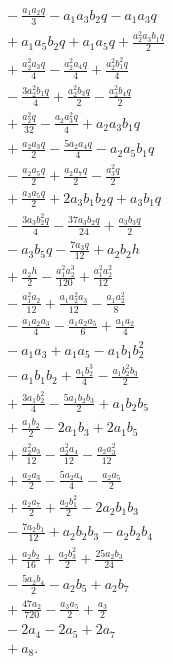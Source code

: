 \begin{align*}
&{}- \frac{a_{1} a_{2} q}{3} - a_{1} a_{3} b_{2} q - a_{1} a_{3} q\\
&{}+ a_{1} a_{5} b_{2} q + a_{1} a_{5} q + \frac{a_{2}^{2} a_{3} b_{1} q}{2}\\
&{}+ \frac{a_{2}^{2} a_{3} q}{4} - \frac{a_{2}^{2} a_{4} q}{4} + \frac{a_{2}^{2} b_{1}^{2} q}{4}\\
&{}- \frac{3 a_{2}^{2} b_{1} q}{4} + \frac{a_{2}^{2} b_{3} q}{2} - \frac{a_{2}^{2} b_{4} q}{2}\\
&{}+ \frac{a_{2}^{2} q}{32} - \frac{a_{2} a_{3}^{2} q}{4} + a_{2} a_{3} b_{1} q\\
&{}+ \frac{a_{2} a_{3} q}{2} - \frac{5 a_{2} a_{4} q}{4} - a_{2} a_{5} b_{1} q\\
&{}- \frac{a_{2} a_{5} q}{2} + \frac{a_{2} a_{7} q}{2} - \frac{a_{3}^{2} q}{2}\\
&{}+ \frac{a_{3} a_{5} q}{2} + 2 a_{3} b_{1} b_{2} q + a_{3} b_{1} q\\
&{}- \frac{3 a_{3} b_{2}^{2} q}{4} - \frac{37 a_{3} b_{2} q}{24} + \frac{a_{3} b_{3} q}{2}\\
&{}- a_{3} b_{5} q - \frac{7 a_{3} q}{12} + a_{2} b_{2} h\\
&{}+ \frac{a_{2} h}{2} - \frac{a_{1}^{2} a_{2}^{3}}{120} + \frac{a_{1}^{2} a_{2}^{2}}{12}\\
&{}- \frac{a_{1}^{2} a_{2}}{12} + \frac{a_{1} a_{2}^{2} a_{3}}{12} - \frac{a_{1} a_{2}^{2}}{8}\\
&{}- \frac{a_{1} a_{2} a_{3}}{4} - \frac{a_{1} a_{2} a_{5}}{6} + \frac{a_{1} a_{2}}{4}\\
&{}- a_{1} a_{3} + a_{1} a_{5} - a_{1} b_{1} b_{2}^{2}\\
&{}- a_{1} b_{1} b_{2} + \frac{a_{1} b_{2}^{3}}{4} - \frac{a_{1} b_{2}^{2} b_{3}}{2}\\
&{}+ \frac{3 a_{1} b_{2}^{2}}{4} - \frac{5 a_{1} b_{2} b_{3}}{2} + a_{1} b_{2} b_{5}\\
&{}+ \frac{a_{1} b_{2}}{2} - 2 a_{1} b_{3} + 2 a_{1} b_{5}\\
&{}+ \frac{a_{2}^{2} a_{3}}{12} - \frac{a_{2}^{2} a_{4}}{12} - \frac{a_{2} a_{3}^{2}}{12}\\
&{}+ \frac{a_{2} a_{3}}{2} - \frac{5 a_{2} a_{4}}{4} - \frac{a_{2} a_{5}}{2}\\
&{}+ \frac{a_{2} a_{7}}{2} + \frac{a_{2} b_{1}^{2}}{2} - 2 a_{2} b_{1} b_{3}\\
&{}- \frac{7 a_{2} b_{1}}{12} + a_{2} b_{2} b_{3} - a_{2} b_{2} b_{4}\\
&{}+ \frac{a_{2} b_{2}}{16} + \frac{a_{2} b_{3}^{2}}{2} + \frac{25 a_{2} b_{3}}{24}\\
&{}- \frac{5 a_{2} b_{4}}{2} - a_{2} b_{5} + a_{2} b_{7}\\
&{}+ \frac{47 a_{2}}{720} - \frac{a_{3} a_{5}}{2} + \frac{a_{3}}{2}\\
&{}- 2 a_{4} - 2 a_{5} + 2 a_{7}\\
&{}+ a_{8}.
\end{align*}
